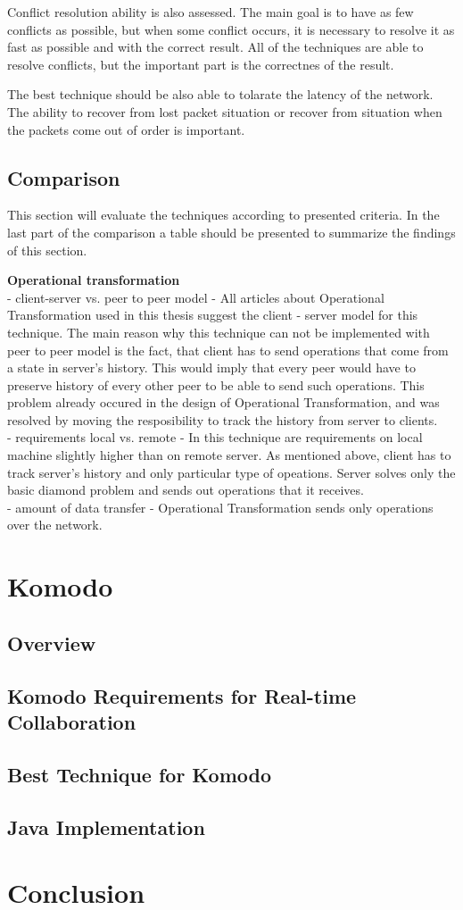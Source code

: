 \documentclass[12pt,oneside]{fithesis2}
\begin{document}
\par Conflict resolution ability is also assessed. The main goal is to have as few conflicts as possible, but when some conflict occurs, it is necessary to resolve it as fast as possible and with the correct result. All of the techniques are able to resolve conflicts, but the important part is the correctnes of the result. 
\par The best technique should be also able to tolarate the latency of the network. The ability to recover from lost packet situation or recover from situation when the packets come out of order is important. 
\section{Comparison}
\par This section will evaluate the techniques according to presented criteria. In the last part of the comparison a table should be presented to summarize the findings of this section.
\par \textbf{Operational transformation} \\
- client-server vs. peer to peer model - All articles about Operational Transformation used in this thesis suggest the client - server model for this technique. The main reason why this technique can not be implemented with peer to peer model is the fact, that client has to send operations that come from a state in server's history. This would imply that every peer would have to preserve history of every other peer to be able to send such operations. This problem already occured in the design of Operational Transformation, and was resolved by moving the resposibility to track the history from server to clients. \\
- requirements local vs. remote - In this technique are requirements on local machine slightly higher than on remote server. As mentioned above, client has to track server's history and only particular type of opeations. Server solves only the basic diamond problem and sends out operations that it receives.\\
- amount of data transfer - Operational Transformation sends only operations over the network. 
\chapter{Komodo}
\section{Overview}
\section{Komodo Requirements for Real-time Collaboration}
\section{Best Technique for Komodo}
\section{Java Implementation}
\chapter{Conclusion}
 
 
\end{document}
